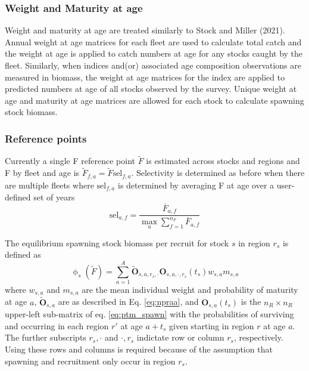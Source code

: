 \documentclass[
]{article}
\begin{document}
\hypertarget{weight-and-maturity-at-age}{%
\subsubsection*{Weight and Maturity at
age}\label{weight-and-maturity-at-age}}

Weight and maturity at age are treated similarly to Stock and Miller
(2021). Annual weight at age matrices for each fleet are used to
calculate total catch and the weight at age is applied to catch numbers
at age for any stocks caught by the fleet. Similarly, when indices
and(or) associated age composition observations are measured in biomass,
the weight at age matrices for the index are applied to predicted
numbers at age of all stocks observed by the survey. Unique weight at
age and maturity at age matrices are allowed for each stock to calculate
spawning stock biomass.

\hypertarget{reference-points}{%
\subsubsection*{Reference points}\label{reference-points}}

Currently a single F reference point \(\widetilde F\) is estimated
across stocks and regions and F by fleet and age is
\(\widetilde F_{f,a} = \widetilde F \text{sel}_{f,a}\). Selectivity is
determined as before when there are multiple fleets where
\(\text{sel}_{f,a}\) is determined by averaging F at age over a
user-defined set of years \begin{equation*}
  \text{sel}_{a,f} = \frac{\overline F_{a,f}}{\max_a \sum^{n_F}_{f=1}{\overline F}_{a,f}}
\end{equation*}

The equilibrium spawning stock biomass per recruit for stock \(s\) in
region \(r_s\) is defined as \begin{equation}\label{eq:ssbpr}
 \upphi_s(\widetilde{F}) = \sum^{A}_{a=1} \widetilde{\mathbf{O}}_{s,a,r_s,\cdot} \mathbf{O}_{s,a,\cdot,r_s}(t_s) w_{s,a} m_{s,a}
\end{equation} where \(w_{s,a}\) and \(m_{s,a}\) are the mean individual
weight and probability of maturity at age \(a\),
\(\widetilde{\mathbf{O}}_{s,a}\) are as described in Eq. \ref{eq:npraa},
and \(\mathbf{O}_{s,a}(t_s)\) is the \(n_R \times n_R\) upper-left
sub-matrix of eq. \ref{eq:ptm_spawn} with the probabilities of surviving
and occurring in each region \(r'\) at age \(a+t_s\) given starting in
region \(r\) at age \(a\). The further subscripts \(r_s,\cdot\) and
\(\cdot,r_s\) indictate row or column \(r_s\), respectively. Using these
rows and columns is required because of the assumption that spawning and
recruitment only occur in region \(r_s\).
\end{document}
